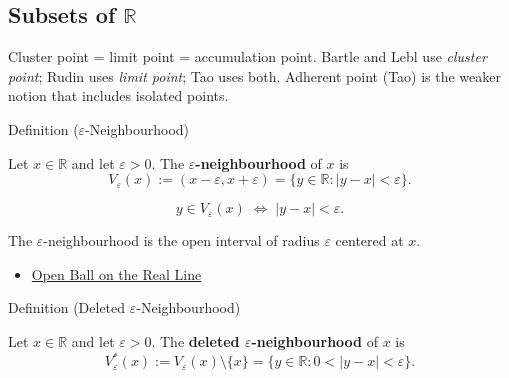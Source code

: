 
\subsection*{Subsets of $\mathbb{R}$}
\label{sec:subsets-of-R}
\begin{remark*}
Cluster point = limit point = accumulation point. Bartle and Lebl use
\emph{cluster point}; Rudin uses \emph{limit point}; Tao uses both.
Adherent point (Tao) is the weaker notion that includes isolated points.
\end{remark*}


\begin{definitionbox}{Definition ($\varepsilon$-Neighbourhood)}
\begin{definition}
\label{def:epsilon-neighbourhood}
Let $x\in\mathbb{R}$ and let $\varepsilon>0$. The
\textbf{$\varepsilon$-neighbourhood} of $x$ is
\[
  V_\varepsilon(x):=(x-\varepsilon,x+\varepsilon)
  =\{y\in\mathbb{R}: |y-x|<\varepsilon\}.
\]
\end{definition}
\end{definitionbox}

\begin{remark*}
\[
  y\in V_\varepsilon(x)\;\Longleftrightarrow\; |y-x|<\varepsilon.
\]
\end{remark*}

\begin{remark*}[Interpretation]
The $\varepsilon$-neighbourhood is the open interval of radius
$\varepsilon$ centered at $x$.
\end{remark*}

\begin{dependencies}
\begin{itemize}
  \item \hyperref[def:open-ball]{Open Ball on the Real Line}
\end{itemize}
\end{dependencies}

\begin{definitionbox}{Definition (Deleted $\varepsilon$-Neighbourhood)}
\begin{definition}
\label{def:deleted-epsilon-neighbourhood}
Let $x\in\mathbb{R}$ and let $\varepsilon>0$. The
\textbf{deleted $\varepsilon$-neighbourhood} of $x$ is
\[
  V_\varepsilon^*(x):=V_\varepsilon(x)\setminus\{x\}
  =\{y\in\mathbb{R}:0<|y-x|<\varepsilon\}.
\]
\end{definition}
\end{definitionbox}

